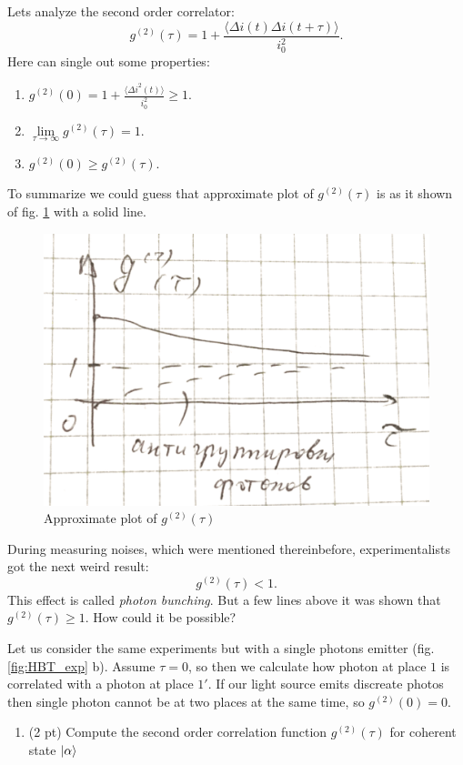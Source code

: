 Lets analyze the second order correlator:
\begin{equation}
	g^{(2)} (\tau) = 1 + \frac{\langle \Delta i(t) \Delta i (t + \tau) \rangle}{i_0^2}.
\end{equation}
Here can single out some properties:
\begin{enumerate}
	\item $g^{(2)}(0) = 1 + \frac{\langle \Delta i^2 (t) \rangle}{i_0^2} \geq 1 $.
	\item $\lim\limits_{\tau \to \infty} g^{(2)}(\tau) = 1$.
	\item $g^{(2)}(0) \geq g^{(2)}(\tau)$.
\end{enumerate}
To summarize we could guess that approximate plot of $g^{(2)}(\tau)$ is as it shown of fig. \ref{fig:g2tau_apprx} with a solid line.
\begin{figure}[h!]
	\centering
	\includegraphics[width=0.5\linewidth]{fig/L3/g2tau_apprx}
	\caption{Approximate plot of $g^{(2)}(\tau)$}
	\label{fig:g2tau_apprx}
\end{figure}

During measuring noises, which were mentioned thereinbefore, experimentalists got the next weird result:
\begin{equation}
	g^{(2)}(\tau) < 1.
\end{equation}
This effect is called \textit{photon bunching}. But a few lines above it was shown that $g^{(2)}(\tau) \geq 1$. How could it be possible?

Let us consider the same experiments but with a single photons emitter (fig. \ref{fig:HBT_exp} b). Assume $\tau = 0$, so then we calculate how photon at place $1$ is correlated with a photon at place $1'$. If our light source emits discreate photos then single photon cannot be at two places at the same time, so $g^{(2)}(0) = 0$.


\begin{hw}

	\begin{enumerate}
		\item (2 pt) Compute the second order correlation function $g^{(2)}(\tau)$ for coherent state $\left\lvert {\alpha} \right\rangle$
	\end{enumerate}	
\end{hw}	

